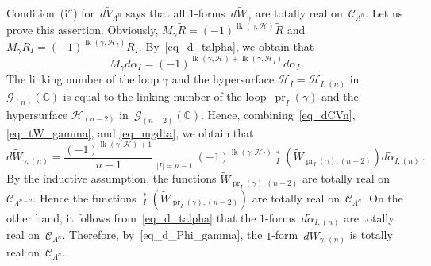 \documentclass[reqno,tbtags,12pt]{amsart}
\numberwithin{equation}{section}
\newcommand{\CH}{\mathcal{H}}
\newcommand{\CC}{\mathcal{C}}
\newcommand{\C}{\mathbb{C}}
\newcommand{\tV}{\widetilde{V}}
\newcommand{\tW}{\widetilde{W}}
\newcommand{\tR}{\widetilde{R}}
\newcommand{\talpha}{\widetilde{\alpha}}
\newcommand{\CG}{\mathcal{G}}
\newcommand{\pr}{\mathop{\mathrm{pr}}\nolimits}
\newcommand{\tpr}{\mathop{\widetilde{\mathrm{pr}}}\nolimits}
\newcommand{\lk}{\mathop{\mathrm{lk}}\nolimits}
\theoremstyle{definition}
\begin{document}
Condition~(i${}''$) for~$d\tV_{\Lambda^n}$ says that all $1$-forms~$d\tW_{\gamma}$ are totally real on~$\CC_{\Lambda^n}$. Let us prove this assertion. Obviously, $M_{\gamma}\tR=(-1)^{\lk(\gamma,\CH)}\tR$ and
$M_{\gamma}\tR_{I}=(-1)^{\lk(\gamma,\CH_{I})}\tR_{I}$. By~\eqref{eq_d_talpha}, we obtain that \begin{equation}\label{eq_mgdta}
M_{\gamma}d\talpha_{I}=(-1)^{\lk(\gamma,\CH)+\lk(\gamma,\CH_{I})}d\talpha_{I}.
\end{equation}
The linking number of the loop $\gamma$ and the hypersurface $\CH_I=\CH_{I,(n)}$ in~$\CG_{(n)}(\C)$ is equal to the linking number of the loop~$\pr_I(\gamma)$ and the hypersurface $\CH_{(n-2)}$ in~$\CG_{(n-2)}(\C)$.
Hence,  combining~\eqref{eq_dCVn}, \eqref{eq_tW_gamma}, and \eqref{eq_mgdta}, we obtain that
\begin{equation}\label{eq_d_Phi_gamma}
d\tW_{\gamma,(n)}=\frac{(-1)^{\lk(\gamma,\CH)+1}}{n-1}\mathop{\sum_{I\subset\{0,\ldots,n\},}}\limits_{|I|=n-1}(-1)^{\lk(\gamma,\CH_I)}\tpr^*_I\left(\tW_{\pr_I(\gamma),(n-2)}\right)d\talpha_{I,(n)}\,.
\end{equation}
By the inductive assumption, the functions $\tW_{\pr_I(\gamma),(n-2)}$ are totally real on~$\CC_{\Lambda^{n-2}}$. Hence the functions $\tpr^*_I\left(\tW_{\pr_I(\gamma),(n-2)}\right)$ are totally real on~$\CC_{\Lambda^{n}}$. On the other hand, it follows from~\eqref{eq_d_talpha}  that the $1$-forms~$d\talpha_{I,(n)}$ are totally real on~$\CC_{\Lambda^{n}}$. Therefore, by~\eqref{eq_d_Phi_gamma}, the $1$-form~$d\tW_{\gamma,(n)}$ is totally real on~$\CC_{\Lambda^{n}}$.
\end{document}
